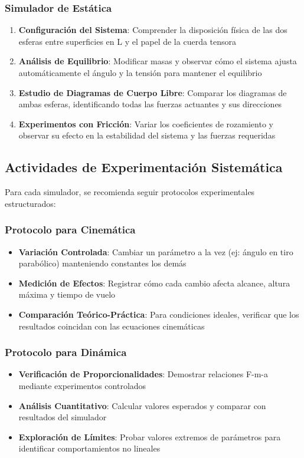 \subsubsection{Simulador de Estática}
\begin{enumerate}
    \item \textbf{Configuración del Sistema}: Comprender la disposición física de las dos esferas entre superficies en L y el papel de la cuerda tensora
    \item \textbf{Análisis de Equilibrio}: Modificar masas y observar cómo el sistema ajusta automáticamente el ángulo y la tensión para mantener el equilibrio
    \item \textbf{Estudio de Diagramas de Cuerpo Libre}: Comparar los diagramas de ambas esferas, identificando todas las fuerzas actuantes y sus direcciones
    \item \textbf{Experimentos con Fricción}: Variar los coeficientes de rozamiento y observar su efecto en la estabilidad del sistema y las fuerzas requeridas
\end{enumerate}

\subsection{Actividades de Experimentación Sistemática}

Para cada simulador, se recomienda seguir protocolos experimentales estructurados:

\subsubsection{Protocolo para Cinemática}
\begin{itemize}
    \item \textbf{Variación Controlada}: Cambiar un parámetro a la vez (ej: ángulo en tiro parabólico) manteniendo constantes los demás
    \item \textbf{Medición de Efectos}: Registrar cómo cada cambio afecta alcance, altura máxima y tiempo de vuelo
    \item \textbf{Comparación Teórico-Práctica}: Para condiciones ideales, verificar que los resultados coincidan con las ecuaciones cinemáticas
\end{itemize}

\subsubsection{Protocolo para Dinámica}
\begin{itemize}
    \item \textbf{Verificación de Proporcionalidades}: Demostrar relaciones F-m-a mediante experimentos controlados
    \item \textbf{Análisis Cuantitativo}: Calcular valores esperados y comparar con resultados del simulador
    \item \textbf{Exploración de Límites}: Probar valores extremos de parámetros para identificar comportamientos no lineales
\end{itemize}

